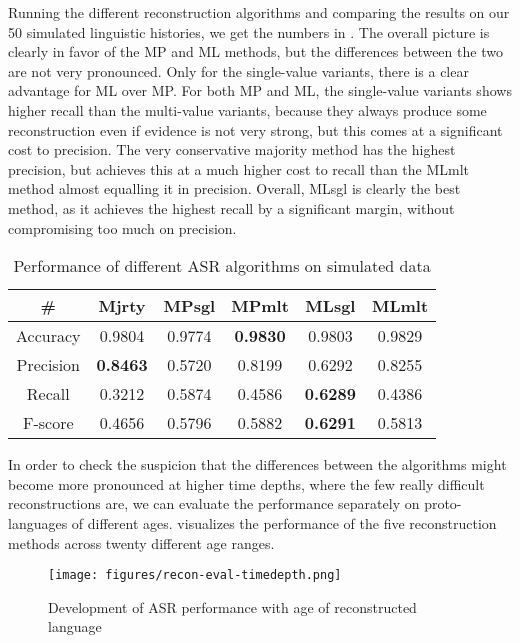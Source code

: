 Running the different reconstruction algorithms and comparing the results on our 50 simulated linguistic histories, we get the numbers in . The overall picture is clearly in favor of the MP and ML methods, but the differences between the two are not very pronounced. Only for the single-value variants, there is a clear advantage for ML over MP. For both MP and ML, the single-value variants shows higher recall than the multi-value variants, because they always produce some reconstruction even if evidence is not very strong, but this comes at a significant cost to precision. The very conservative majority method has the highest precision, but achieves this at a much higher cost to recall than the MLmlt method almost equalling it in precision. Overall, MLsgl is clearly the best method, as it achieves the highest recall by a significant margin, without compromising too much on precision.

\begin{table}
 \centering
 \begin{tabular}{cccccc}
  \hline \hline
  \# & Mjrty & MPsgl & MPmlt & MLsgl & MLmlt\\ \hline
  Accuracy & 0.9804 & 0.9774 & \textbf{0.9830} & 0.9803 & 0.9829\\
  Precision & \textbf{0.8463} & 0.5720 & 0.8199 & 0.6292 & 0.8255\\
  Recall & 0.3212 & 0.5874 & 0.4586 & \textbf{0.6289} & 0.4386\\
  F-score & 0.4656 & 0.5796 & 0.5882 & \textbf{0.6291} & 0.5813\\
  \hline
 \end{tabular}
 \caption{Performance of different ASR algorithms on simulated data}
 \label{asr-overall-results}
\end{table}

In order to check the suspicion that the differences between the algorithms might become more pronounced at higher time depths, where the few really difficult reconstructions are, we can evaluate the performance separately on proto-languages of different ages.  visualizes the performance of the five reconstruction methods across twenty different age ranges.

\begin{figure}
 \texttt{[image: figures/recon-eval-timedepth.png]}
 \caption{Development of ASR performance with age of reconstructed language}
 \label{asr-results-by-age}
\end{figure}

